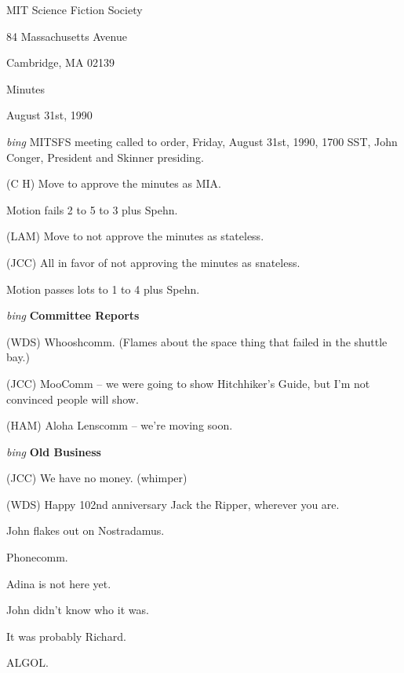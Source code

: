 \setlength{\topmargin}{-0.5in}
\setlength{\oddsidemargin}{0.0in}
\setlength{\evensidemargin}{0.0in}
\setlength{\textheight}{9in}
\setlength{\textwidth}{6.5in}



\begin{center}
MIT Science Fiction Society

84 Massachusetts Avenue

Cambridge, MA 02139

\vspace{0.2in}
Minutes

August 31st, 1990

\end{center}
 
\vspace{0.15in}
{\em bing\/}  MITSFS meeting called to order, Friday, August 31st, 1990,
1700 SST, John Conger, President and Skinner presiding.

(C H) Move to approve the minutes as MIA.

Motion fails 2 to 5 to 3 plus Spehn.

(LAM) Move to not approve the minutes as stateless.

(JCC) All in favor of not approving the minutes as snateless.

Motion passes lots to 1 to 4 plus Spehn.

\vspace{0.15in}
{\em bing\/} {\bf Committee Reports\/}

(WDS) Whooshcomm.  (Flames about the space thing that failed in the shuttle
bay.)

(JCC) MooComm -- we were going to show Hitchhiker's Guide, but I'm not
convinced people will show.

(HAM) Aloha Lenscomm -- we're moving soon.

\vspace{.15in}
{\em bing\/} {\bf Old Business\/}

(JCC) We have no money.  (whimper)

(WDS) Happy 102nd anniversary Jack the Ripper, wherever you are.

John flakes out on Nostradamus.

Phonecomm.

Adina is not here yet.

John didn't know who it was.

It was probably Richard.

ALGOL.

